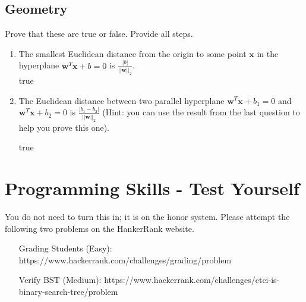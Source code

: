 \documentclass[a4paper]{article}
\theoremstyle{definition}
\newenvironment{soln}{
    \leavevmode\color{blue}\ignorespaces
}{}
\begin{document}
\subsection{Geometry}
Prove that these are true or false. Provide all steps.
\begin{enumerate}
\item 	The smallest Euclidean distance from the origin to some point $\mathbf{x}$ in the hyperplane $\mathbf{w}^T\mathbf{x} + b = 0$ is $\frac{|b|}{||\mathbf{w}||_2}$.\\
\begin{soln}  true \end{soln}

\item 	The Euclidean distance between two parallel hyperplane $\mathbf{w}^T\mathbf{x} + b_1 = 0$ and $\mathbf{w}^T\mathbf{x} + b_2 = 0$ is $\frac{|b_1 - b_2|}{||\mathbf{w}||_2}$ (Hint: you can use the result from the last question to help you prove this one).

\begin{soln}  true \end{soln}

\end{enumerate}



\section{Programming Skills - Test Yourself}
You do not need to turn this in; it is on the honor system.  Please attempt the following two problems on the HankerRank website.
\begin{itemize}
\item[Grading Students (Easy):]
https://www.hackerrank.com/challenges/grading/problem
\item[Verify BST (Medium):]
https://www.hackerrank.com/challenges/ctci-is-binary-search-tree/problem
\end{itemize}





\end{document}
